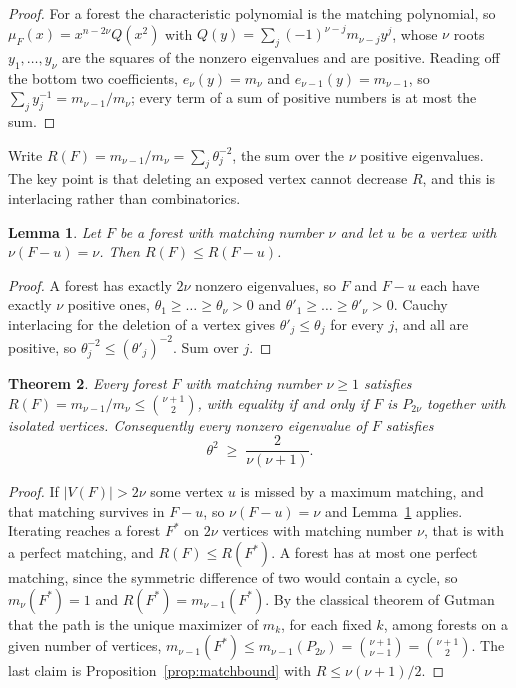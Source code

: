 \documentclass[11pt]{article}
\newtheorem{theorem}{Theorem}
\newtheorem{lemma}[theorem]{Lemma}
\theoremstyle{remark}
\begin{document}
\begin{proof}
For a forest the characteristic polynomial is the matching polynomial, so
$\mu_F(x)=x^{n-2\nu}Q(x^2)$ with $Q(y)=\sum_{j}(-1)^{\nu-j}m_{\nu-j}y^{j}$, whose $\nu$ roots
$y_1,\dots,y_\nu$ are the squares of the nonzero eigenvalues and are positive. Reading off the
bottom two coefficients, $e_\nu(y)=m_\nu$ and $e_{\nu-1}(y)=m_{\nu-1}$, so
$\sum_j y_j^{-1}=m_{\nu-1}/m_\nu$; every term of a sum of positive numbers is at most the sum.
\end{proof}

Write $R(F)=m_{\nu-1}/m_\nu=\sum_j\theta_j^{-2}$, the sum over the $\nu$ positive eigenvalues. The
key point is that deleting an exposed vertex cannot decrease $R$, and this is interlacing rather
than combinatorics.

\begin{lemma}\label{lem:interlace}
Let $F$ be a forest with matching number $\nu$ and let $u$ be a vertex with $\nu(F-u)=\nu$. Then
$R(F)\le R(F-u)$.
\end{lemma}

\begin{proof}
A forest has exactly $2\nu$ nonzero eigenvalues, so $F$ and $F-u$ each have exactly $\nu$ positive
ones, $\theta_1\ge\dots\ge\theta_\nu>0$ and $\theta'_1\ge\dots\ge\theta'_\nu>0$. Cauchy interlacing
for the deletion of a vertex gives $\theta'_j\le\theta_j$ for every $j$, and all are positive, so
$\theta_j^{-2}\le(\theta'_j)^{-2}$. Sum over $j$.
\end{proof}

\begin{theorem}\label{thm:ratio}
Every forest $F$ with matching number $\nu\ge1$ satisfies
$R(F)=m_{\nu-1}/m_\nu\le\binom{\nu+1}{2}$, with equality if and only if $F$ is $P_{2\nu}$ together
with isolated vertices. Consequently every nonzero eigenvalue of $F$ satisfies
\[
  \theta^2\;\ge\;\frac{2}{\nu(\nu+1)} .
\]
\end{theorem}

\begin{proof}
If $|V(F)|>2\nu$ some vertex $u$ is missed by a maximum matching, and that matching survives in
$F-u$, so $\nu(F-u)=\nu$ and Lemma~\ref{lem:interlace} applies. Iterating reaches a forest $F^\ast$
on $2\nu$ vertices with matching number $\nu$, that is with a perfect matching, and
$R(F)\le R(F^\ast)$. A forest has at most one perfect matching, since the symmetric difference of
two would contain a cycle, so $m_\nu(F^\ast)=1$ and $R(F^\ast)=m_{\nu-1}(F^\ast)$. By the classical
theorem of Gutman that the path is the unique maximizer of $m_k$, for each fixed $k$, among forests
on a given number of vertices,
$m_{\nu-1}(F^\ast)\le m_{\nu-1}(P_{2\nu})=\binom{\nu+1}{\nu-1}=\binom{\nu+1}{2}$. The last claim is
Proposition~\ref{prop:matchbound} with $R\le\nu(\nu+1)/2$.
\end{proof}
\end{document}
